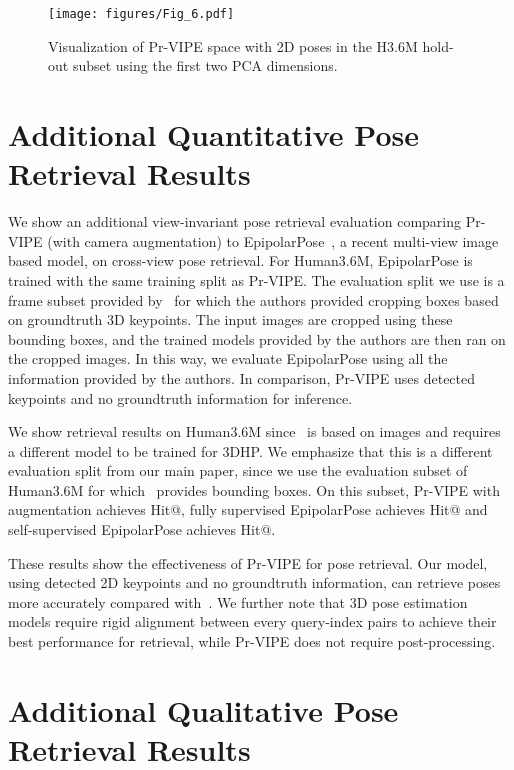 \begin{figure*}[t!]
  \centering
  \texttt{[image: figures/Fig\_6.pdf]}
  \caption{Visualization of Pr-VIPE space with 2D poses in the H3.6M hold-out subset using the first two PCA dimensions.}
  \label{fig:pca_supp}
  \vspace{-0.3cm}
\end{figure*}


\section{Additional Quantitative Pose Retrieval Results}\label{sec:additional_comp}

We show an additional view-invariant pose retrieval evaluation comparing Pr-VIPE (with camera augmentation) to EpipolarPose~\cite{kocabas2019self}, a recent multi-view image based model, on cross-view pose retrieval. For Human3.6M, EpipolarPose is trained with the same training split as Pr-VIPE. The evaluation split we use is a frame subset provided by~\cite{kocabas2019self} for which the authors provided cropping boxes based on groundtruth 3D keypoints. The input images are cropped using these bounding boxes, and the trained models provided by the authors are then ran on the cropped images. In this way, we evaluate EpipolarPose using all the information provided by the authors. In comparison, Pr-VIPE uses detected keypoints and no groundtruth information for inference.

We show retrieval results on Human3.6M since~\cite{kocabas2019self} is based on images and requires a different model to be trained for 3DHP. We emphasize that this is a different evaluation split from our main paper, since we use the evaluation subset of Human3.6M for which~\cite{kocabas2019self} provides bounding boxes. On this subset, Pr-VIPE with augmentation achieves  Hit@, fully supervised EpipolarPose achieves  Hit@ and self-supervised EpipolarPose achieves  Hit@.

These results show the effectiveness of Pr-VIPE for pose retrieval. Our model, using detected 2D keypoints and no groundtruth information, can retrieve poses more accurately compared with~\cite{kocabas2019self}. We further note that 3D pose estimation models require rigid alignment between every query-index pairs to achieve their best performance for retrieval, while Pr-VIPE does not require post-processing. 

\section{Additional Qualitative Pose Retrieval Results}\label{sec:pose_retrieval_qres}


